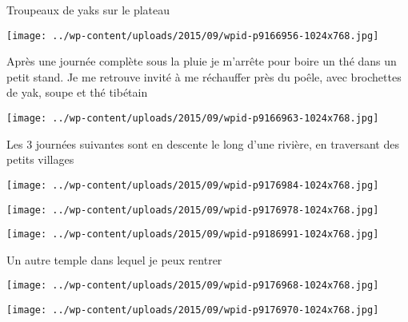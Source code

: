  

 Troupeaux de yaks sur le plateau 

 

\begin{center} \texttt{[image: ../wp-content/uploads/2015/09/wpid-p9166956-1024x768.jpg]} \end{center}

 

 Après une journée complète sous la pluie je m'arrête pour boire un thé dans un petit stand. Je me retrouve invité à me réchauffer près du poêle, avec brochettes de yak, soupe et thé tibétain 

 

\begin{center} \texttt{[image: ../wp-content/uploads/2015/09/wpid-p9166963-1024x768.jpg]} \end{center}

 

 Les 3 journées suivantes sont en descente le long d'une rivière, en traversant des petits villages 

 

\begin{center} \texttt{[image: ../wp-content/uploads/2015/09/wpid-p9176984-1024x768.jpg]} \end{center}

 

 

\begin{center} \texttt{[image: ../wp-content/uploads/2015/09/wpid-p9176978-1024x768.jpg]} \end{center}

 

 

\begin{center} \texttt{[image: ../wp-content/uploads/2015/09/wpid-p9186991-1024x768.jpg]} \end{center}

 

 Un autre temple dans lequel je peux rentrer 

 

\begin{center} \texttt{[image: ../wp-content/uploads/2015/09/wpid-p9176968-1024x768.jpg]} \end{center}

 

 

\begin{center} \texttt{[image: ../wp-content/uploads/2015/09/wpid-p9176970-1024x768.jpg]} \end{center}

